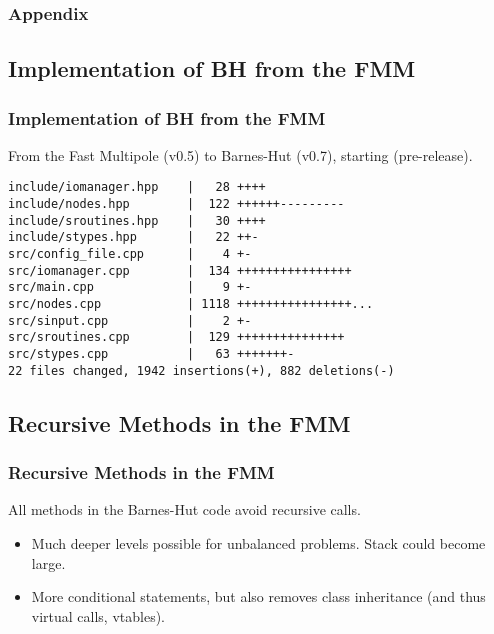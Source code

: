 \appendix
{}

\begin{frame}
	\frametitle{Appendix}
	\tableofcontents
\end{frame}

\begin{frame}[fragile=singleslide]
\section{Implementation of BH from the FMM}
\frametitle{Implementation of BH from the FMM}
From the Fast Multipole (v0.5) to Barnes-Hut (v0.7), starting  (pre-release).
\begin{lstlisting}
include/iomanager.hpp    |   28 ++++
include/nodes.hpp        |  122 ++++++---------
include/sroutines.hpp    |   30 ++++
include/stypes.hpp       |   22 ++-
src/config_file.cpp      |    4 +-
src/iomanager.cpp        |  134 ++++++++++++++++
src/main.cpp             |    9 +-
src/nodes.cpp            | 1118 ++++++++++++++++...
src/sinput.cpp           |    2 +-
src/sroutines.cpp        |  129 +++++++++++++++
src/stypes.cpp           |   63 +++++++-
22 files changed, 1942 insertions(+), 882 deletions(-)
\end{lstlisting}
\end{frame}


\begin{frame}
	\section{Recursive Methods in the FMM}
	\frametitle{Recursive Methods in the FMM}
	All methods in the Barnes-Hut code avoid recursive calls.
	\begin{itemize}
		\item Much deeper levels possible for unbalanced problems. Stack could become large.
		\item More conditional statements, but also removes class inheritance (and thus virtual calls, vtables).
	\end{itemize}
\end{frame}

